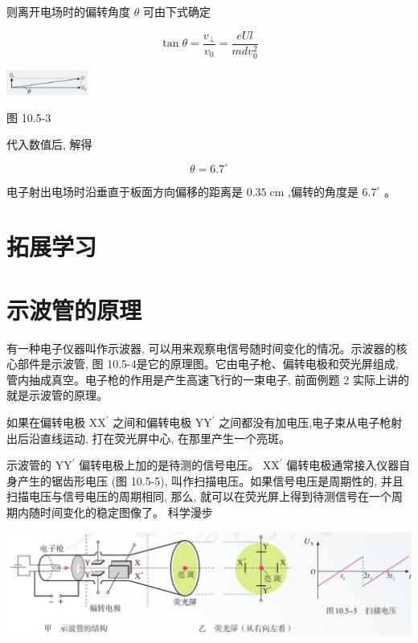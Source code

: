 \documentclass[10pt]{article}
\begin{document}
则离开电场时的偏转角度 \(\theta\) 可由下式确定

\[
\tan \theta = \frac{{v}_{ \bot }}{{v}_{0}} = \frac{eUl}{{md}{v}_{0}^{2}}
\]

\begin{center}
\includegraphics[max width=0.2\textwidth]{images/01911d5f-8e38-70c0-b5b8-2b399bd115b6_52_939888.jpg}
\end{center}

图 10.5-3

代入数值后, 解得

\[
\theta = {6.7}^{ \circ }
\]

电子射出电场时沿垂直于板面方向偏移的距离是 \({0.35}\mathrm{\;{cm}}\) ,偏转的角度是 \({6.7}^{ \circ }\) 。

\section*{拓展学习}

\section*{示波管的原理}

有一种电子仪器叫作示波器, 可以用来观察电信号随时间变化的情况。示波器的核心部件是示波管, 图 10.5-4是它的原理图。它由电子枪、偏转电极和荧光屏组成, 管内抽成真空。电子枪的作用是产生高速飞行的一束电子, 前面例题 2 实际上讲的就是示波管的原理。

如果在偏转电极 \({\mathrm{{XX}}}^{\prime }\) 之间和偏转电极 \({\mathrm{{YY}}}^{\prime }\) 之间都没有加电压,电子束从电子枪射出后沿直线运动, 打在荧光屏中心, 在那里产生一个亮斑。

示波管的 \({\mathrm{{YY}}}^{\prime }\) 偏转电极上加的是待测的信号电压。 \({\mathrm{{XX}}}^{\prime }\) 偏转电极通常接入仪器自身产生的锯齿形电压 (图 10.5-5), 叫作扫描电压。如果信号电压是周期性的, 并且扫描电压与信号电压的周期相同, 那么, 就可以在荧光屏上得到待测信号在一个周期内随时间变化的稳定图像了。 科学漫步

\begin{center}
\includegraphics[max width=1.0\textwidth]{images/01911d5f-8e38-70c0-b5b8-2b399bd115b6_52_382839.jpg}
\end{center}
\end{document}
